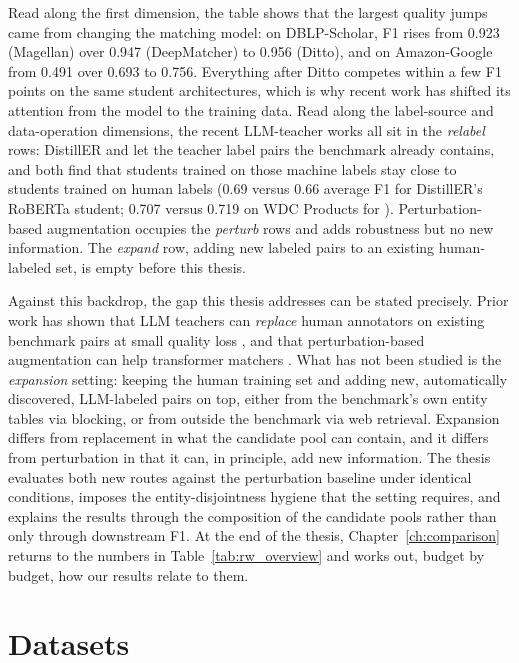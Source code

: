 \documentclass[a4paper,oneside,bibliography=totoc]{scrbook}
\begin{document}
Read along the first dimension, the table shows that the largest quality jumps came from changing the matching model: on DBLP-Scholar, F1 rises from 0.923 (Magellan) over 0.947 (DeepMatcher) to 0.956 (Ditto), and on Amazon-Google from 0.491 over 0.693 to 0.756. Everything after Ditto competes within a few F1 points on the same student architectures, which is why recent work has shifted its attention from the model to the training data. Read along the label-source and data-operation dimensions, the recent LLM-teacher works all sit in the \emph{relabel} rows: DistillER and \citet{steiner2026labeling} let the teacher label pairs the benchmark already contains, and both find that students trained on those machine labels stay close to students trained on human labels (0.69 versus 0.66 average F1 for DistillER's RoBERTa student; 0.707 versus 0.719 on WDC Products for \citealt{steiner2026labeling}). Perturbation-based augmentation \cite{li2020deep,miao2021rotom} occupies the \emph{perturb} rows and adds robustness but no new information. The \emph{expand} row, adding new labeled pairs to an existing human-labeled set, is empty before this thesis.

Against this backdrop, the gap this thesis addresses can be stated precisely. Prior work has shown that LLM teachers can \emph{replace} human annotators on existing benchmark pairs at small quality loss \cite{steiner2026labeling,zeakis2026distiller}, and that perturbation-based augmentation can help transformer matchers \cite{li2020deep,miao2021rotom}. What has not been studied is the \emph{expansion} setting: keeping the human training set and adding new, automatically discovered, LLM-labeled pairs on top, either from the benchmark's own entity tables via blocking, or from outside the benchmark via web retrieval. Expansion differs from replacement in what the candidate pool can contain, and it differs from perturbation in that it can, in principle, add new information. The thesis evaluates both new routes against the perturbation baseline under identical conditions, imposes the entity-disjointness hygiene that the setting requires, and explains the results through the composition of the candidate pools rather than only through downstream F1. At the end of the thesis, Chapter~\ref{ch:comparison} returns to the numbers in Table~\ref{tab:rw_overview} and works out, budget by budget, how our results relate to them.


\chapter{Datasets}
\label{ch:datasets}
\end{document}
